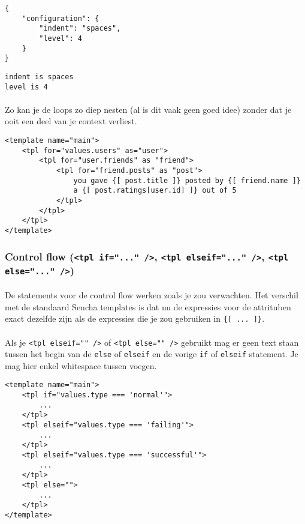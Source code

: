 \begin{lstlisting}
{
	"configuration": {
		"indent": "spaces",
		"level": 4
	}
}
\end{lstlisting}

\begin{lstlisting}
indent is spaces
level is 4
\end{lstlisting}

\paragraph {} Zo kan je de loops zo diep nesten (al is dit vaak geen goed idee) zonder dat
je ooit een deel van je context verliest.

\begin{lstlisting}
<template name="main">
	<tpl for="values.users" as="user">
		<tpl for="user.friends" as "friend">
			<tpl for="friend.posts" as "post">
				you gave {[ post.title ]} posted by {[ friend.name ]}
				a {[ post.ratings[user.id] ]} out of 5
			</tpl>
		</tpl>
	</tpl>
</template>
\end{lstlisting}


\subsubsection {Control flow (\lstinline{<tpl if="..." />},
	\lstinline{<tpl elseif="..." />}, \lstinline{<tpl else="..." />})}

\paragraph {} De statements voor de control flow werken zoals je zou verwachten. Het
verschil met de standaard Sencha templates is dat nu de expressies voor de attrituben
exact dezelfde zijn als de expressies die je zou gebruiken in \lstinline|{[ ... ]}|.

\paragraph {}Als je \lstinline{<tpl elseif="" />} of \lstinline{<tpl else="" />} gebruikt
mag er geen text staan tussen het begin van de \lstinline{else} of \lstinline{elseif} en
de vorige \lstinline{if} of \lstinline{elseif} statement. Je mag hier enkel whitespace
tussen voegen.

\begin{lstlisting}
<template name="main">
	<tpl if="values.type === 'normal'">
		...
	</tpl>
	<tpl elseif="values.type === 'failing'">
		...
	</tpl>
	<tpl elseif="values.type === 'successful'">
		...
	</tpl>
	<tpl else="">
		...
	</tpl>
</template>
\end{lstlisting}

